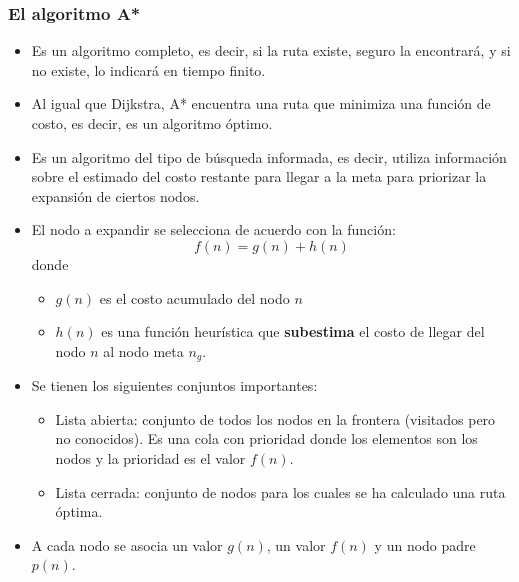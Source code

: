 \documentclass[10pt,spanish,aspectratio=1610]{beamer}
\begin{document}
\begin{frame}\frametitle{El algoritmo A*}
  \begin{itemize}
  \item Es un algoritmo completo, es decir, si la ruta existe, seguro la encontrará, y si no existe, lo indicará en tiempo finito.
  \item Al igual que Dijkstra, A* encuentra una ruta que minimiza una función de costo, es decir, es un algoritmo óptimo.
  \item Es un algoritmo del tipo de búsqueda informada, es decir, utiliza información sobre el estimado del costo restante para llegar a la meta para priorizar la expansión de ciertos nodos. 
  \item El nodo a expandir se selecciona de acuerdo con la función:
    \[f(n) = g(n) + h(n)\]
    donde
    \begin{itemize}
    \item $g(n)$ es el costo acumulado del nodo $n$
    \item $h(n)$ es una función heurística que \textbf{subestima} el costo de llegar del nodo $n$ al nodo meta $n_g$. 
    \end{itemize}
  \item Se tienen los siguientes conjuntos importantes:
    \begin{itemize}
    \item Lista abierta: conjunto de todos los nodos en la frontera (visitados pero no conocidos). Es una cola con prioridad donde los elementos son los nodos y la prioridad es el valor $f(n)$.
    \item Lista cerrada: conjunto de nodos para los cuales se ha calculado una ruta óptima. 
    \end{itemize}
    \item A cada nodo se asocia un valor $g(n)$, un valor $f(n)$ y un nodo padre $p(n)$. 
  \end{itemize}
\end{frame}
\end{document}
